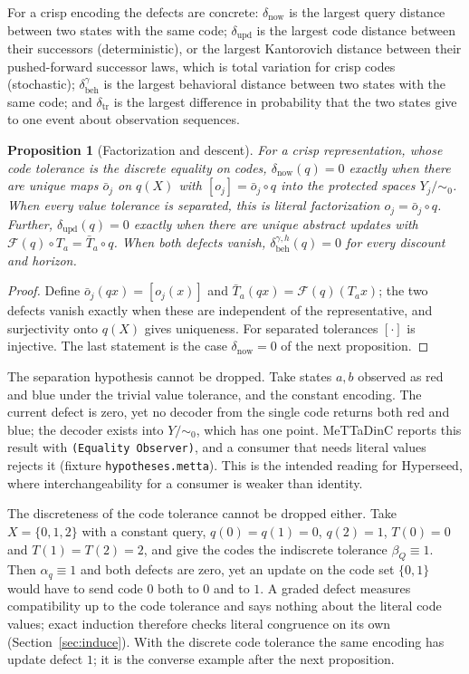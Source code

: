 \documentclass[11pt]{article}
\newcommand{\code}[1]{\texttt{#1}}
\newcommand{\dnow}{\delta_{\mathrm{now}}}
\newcommand{\dupd}{\delta_{\mathrm{upd}}}
\newcommand{\dbd}{\delta_{\mathrm{beh}}}
\newcommand{\dtr}{\delta_{\mathrm{tr}}}
\theoremstyle{definition}
\theoremstyle{plain}
\newtheorem{proposition}[definition]{Proposition}
\begin{document}
For a crisp encoding the defects are concrete: $\dnow$ is the largest query distance between two
states with the same code; $\dupd$ is the largest code distance between their successors
(deterministic), or the largest Kantorovich distance between their pushed-forward successor laws,
which is total variation for crisp codes (stochastic); $\dbd^\gamma$ is the largest behavioral
distance between two states with the same code; and $\dtr$ is the largest difference in
probability that the two states give to one event about observation sequences.

\begin{proposition}[Factorization and descent]\label{prop:descent}
For a crisp representation, whose code tolerance is the discrete equality on codes, $\dnow(q)=0$
exactly when there are unique maps $\bar o_j$ on $q(X)$
with $[o_j]=\bar o_j\circ q$ into the protected spaces $Y_j/{\sim_0}$. When every value tolerance
is separated, this is literal factorization $o_j=\bar o_j\circ q$. Further, $\dupd(q)=0$ exactly
when there are unique abstract updates with $\mathcal F(q)\circ T_a=\bar T_a\circ q$. When both
defects vanish, $\dbd^{\gamma,h}(q)=0$ for every discount and horizon.
\end{proposition}

\begin{proof}
Define $\bar o_j(qx)=[o_j(x)]$ and $\bar T_a(qx)=\mathcal F(q)(T_ax)$; the two defects vanish
exactly when these are independent of the representative, and surjectivity onto $q(X)$ gives
uniqueness. For separated tolerances $[\cdot]$ is injective. The last statement is the case
$\dnow=0$ of the next proposition.
\end{proof}

The separation hypothesis cannot be dropped. Take states $a,b$ observed as red and blue under the
trivial value tolerance, and the constant encoding. The current defect is zero, yet no decoder from
the single code returns both red and blue; the decoder exists into $Y/{\sim_0}$, which has one
point. MeTTaDinC reports this result with \code{(Equality Observer)}, and a consumer that needs
literal values rejects it (fixture \code{hypotheses.metta}). This is the intended reading for
Hyperseed, where interchangeability for a consumer is weaker than identity.

The discreteness of the code tolerance cannot be dropped either. Take $X=\{0,1,2\}$ with a constant
query, $q(0)=q(1)=0$, $q(2)=1$, $T(0)=0$ and $T(1)=T(2)=2$, and give the codes the indiscrete
tolerance $\beta_Q\equiv1$. Then $\alpha_q\equiv1$ and both defects are zero, yet an update on the
code set $\{0,1\}$ would have to send code $0$ both to $0$ and to $1$. A graded defect measures
compatibility up to the code tolerance and says nothing about the literal code values; exact
induction therefore checks literal congruence on its own (Section~\ref{sec:induce}). With the
discrete code tolerance the same encoding has update defect $1$; it is the converse example after
the next proposition.
\end{document}

